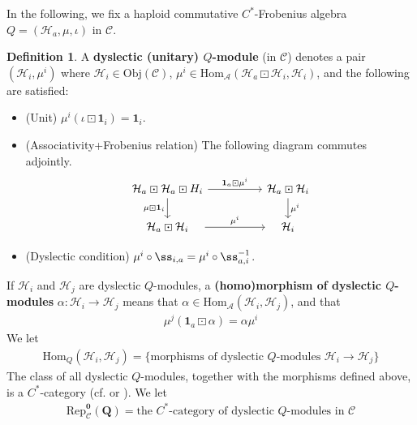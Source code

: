 \documentclass[11pt,b5paper,notitlepage]{article}
\theoremstyle{definition}
\newtheorem{df}{Definition}[section]
\theoremstyle{plain}
\newcommand{\mc}{\mathcal}
\newcommand{\idt}{\mathbf{1}}
\newcommand{\Hom}{\mathrm{Hom}}
\newcommand{\Rep}{\mathrm{Rep}}
\newcommand{\scr}{\mathscr}
\newcommand{\Obj}{\mathrm{Obj}}
\numberwithin{equation}{section}
\begin{document}
In the following, we fix a haploid commutative $C^*$-Frobenius algebra $Q=(\mc H_a,\mu,\iota)$ in $\scr C$. 

\begin{df}\label{lb66}
A \textbf{dyslectic (unitary) $Q$-module} (in $\scr C$) denotes a pair $(\mc H_i,\mu^i)$ where $\mc H_i\in\Obj(\scr C)$, $\mu^i\in\Hom_{\mc A}(\mc H_a\boxdot\mc H_i,\mc H_i)$, and the following are satisfied:	
	\begin{itemize}
		\item (Unit) $\mu^i(\iota\boxdot\idt_i)=\idt_i$.
		\item (Associativity+Frobenius relation) The following diagram commutes adjointly.
		\begin{equation}
			\begin{tikzcd}
				\mc H_a\boxdot\mc H_a\boxdot H_i\arrow[rr,"\idt_a\boxdot\mu^i"]\arrow[d,"\mu\boxdot\idt_i"'] && \mc H_a\boxdot\mc H_i\arrow[d,"\mu^i"]\\
				\quad\mc H_a\boxdot\mc H_i\quad\arrow[rr,"\mu^i"] && \quad\mc H_i\quad
			\end{tikzcd}	
		\end{equation} 
\item (Dyslectic condition) $\mu^i\circ\ss_{i,a}=\mu^i\circ\ss_{a,i}^{-1}$.
	\end{itemize}	
If $\mc H_i$ and $\mc H_j$ are dyslectic $Q$-modules, a \textbf{(homo)morphism of dyslectic $Q$-modules} $\alpha:\mc H_i\rightarrow\mc H_j$ means that $\alpha\in\Hom_{\mc A}(\mc H_i,\mc H_j)$, and that
\begin{align*}
\mu^j(\idt_a\boxdot\alpha)=\alpha\mu^i
\end{align*}
We let
\begin{align*}
\Hom_Q(\mc H_i,\mc H_j)=\{\text{morphisms of dyslectic $Q$-modules }\mc H_i\rightarrow\mc H_j\}
\end{align*}
The class of all dyslectic $Q$-modules, together with the morphisms defined above, is a $C^*$-category (cf.  \cite[Sec. 6.1]{NY16} or \cite[Prop. 2.24]{Gui22}). We let 
\begin{align*}
\pmb{\Rep^0_{\scr C}(Q)}=\text{the $C^*$-category of dyslectic $Q$-modules in $\scr C$}
\end{align*}
\end{df}
\end{document}
